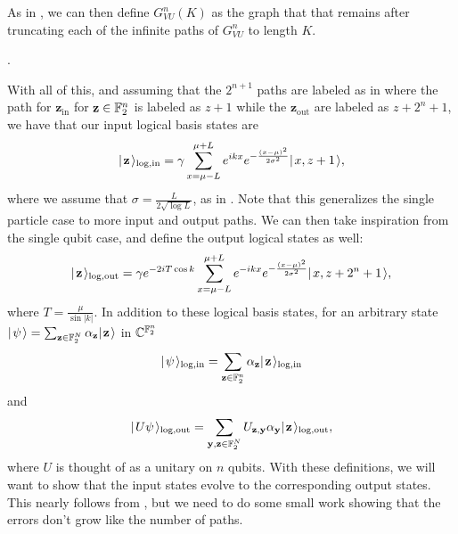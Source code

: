\documentclass[../thesis-main/thesis-main]{subfiles}
\begin{document}
As in , we can then define $G_{VU}^n(K)$ as the graph that that remains after truncating each of the infinite paths of $G_{VU}^n$ to length $K$.

.


With all of this, and assuming that the $2^{n+1}$ paths are labeled as in  where the path for $\mathbf{z}_{\text{in}}$ for $\mathbf{z}\in \mathbb{F}_2^n$ is labeled as $z+1$ while the $\mathbf{z}_{\text{out}}$ are labeled as $z+2^n+1$, we have that our input logical basis states are
\begin{align}
  |\mspace{2mu} \mathbf{z} \mspace{2mu} \rangle_{\text{log},\text{in}} = \gamma \sum_{x = \mu - L}^{\mu + L} e^{ i k x} e^{ - \frac{(x-\mu)^2}{2\sigma^2}} |\mspace{2mu} x,z+1 \mspace{2mu} \rangle,
  \label{eq:multi_qubit_input_encoding}
\end{align}
where we assume that $\sigma = \frac{L}{2\sqrt{\log L}}$, as in .  Note that this generalizes the single particle case  to more input and output paths.  We can then take inspiration from the single qubit case, and define the output logical states as well:
 \begin{align}
  |\mspace{2mu} \mathbf{z} \mspace{2mu} \rangle_{\text{log},\text{out}} = \gamma e^{- 2 i T \cos k} \sum_{x = \mu - L}^{\mu + L} e^{ -i k x} e^{ - \frac{(x-\mu)^2}{2\sigma^2}} |\mspace{2mu} x,z+2^n + 1 \mspace{2mu} \rangle,
  \label{eq:multi_qubit_output_encoding}
\end{align}
where $T = \frac{\mu}{\sin |k|}$.  In addition to these logical basis states, for an arbitrary state $|\mspace{2mu} \psi \mspace{2mu} \rangle = \sum_{\mathbf{z}\in \mathbb{F}_2^N} \alpha_{\mathbf{z}} |\mspace{2mu} \mathbf{z} \mspace{2mu} \rangle$ in $\mathbb{C}^{\mathbb{F}_2^n}$
\begin{align}
  |\mspace{2mu} \psi \mspace{2mu} \rangle_{\text{log},\text{in}} = \sum_{\mathbf{z}\in \mathbb{F}_2^n} \alpha_{\mathbf{z}} |\mspace{2mu} \mathbf{z} \mspace{2mu} \rangle_{\text{log},\text{in}}
\end{align} 
and
\begin{align}
  |\mspace{2mu} U \psi \mspace{2mu} \rangle_{\text{log},\text{out}} = \sum_{\mathbf{y},\mathbf{z}\in\mathbb{F}_2^N} U_{\mathbf{z},\mathbf{y}} \alpha_{\mathbf{y}}|\mspace{2mu} \mathbf{z} \mspace{2mu} \rangle_{\text{log},\text{out}},
\end{align}
where $U$ is thought of as a unitary on $n$ qubits.  With these definitions, we will want to show that the input states evolve to the corresponding output states.  This nearly follows from , but we need to do some small work showing that the errors don't grow like the number of paths.
\end{document}
